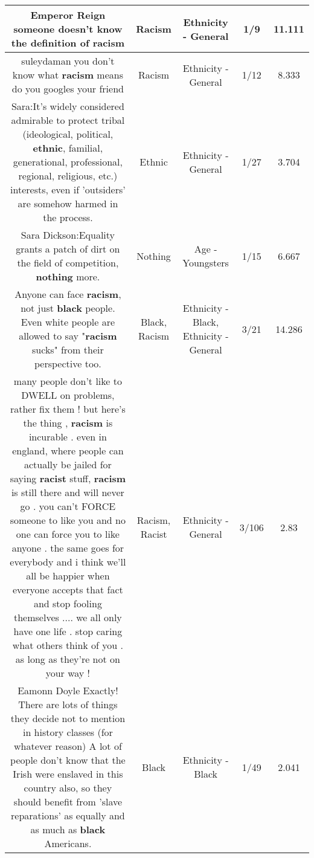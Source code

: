\documentclass[11pt]{article}
\newlength\mylength
\begin{document}
\begin{center}
\begin{longtable}{|C{.65\mylength}|C{.30\mylength}|C{.12\mylength}|C{.12\mylength}|C{.12\mylength}|}
  \small Emperor Reign someone doesn't know the definition of racism\normalsize   & Racism & Ethnicity - General & 1/9 & 11.111 \\  \hline
  \small suleydaman you don't know what \textbf{racism} means do you googles your friend\normalsize   & Racism & Ethnicity - General & 1/12 & 8.333 \\  \hline
  \small Sara:It's widely considered admirable to protect tribal (ideological, political, \textbf{ethnic}, familial, generational, professional, regional, religious, etc.) interests, even if 'outsiders' are somehow harmed in the process.\normalsize   & Ethnic & Ethnicity - General & 1/27 & 3.704 \\  \hline
  \small Sara Dickson:Equality grants a patch of dirt on the field of competition, \textbf{nothing} more.\normalsize   & Nothing & Age - Youngsters & 1/15 & 6.667 \\  \hline
  \small Anyone can face \textbf{racism}, not just \textbf{black} people. Even white people are allowed to say "\textbf{racism} sucks" from their perspective too.\normalsize   & Black, Racism & Ethnicity - Black, Ethnicity - General & 3/21 & 14.286 \\  \hline
  \small many people don't like to DWELL on problems, rather fix them ! but here's the thing , \textbf{racism} is incurable . even in england, where people can actually be jailed for saying \textbf{racist} stuff, \textbf{racism} is still there and will never go . you can't FORCE someone to like you and no one can force you to like anyone . the same goes for everybody and i think we'll all be happier when everyone accepts that fact and stop fooling themselves .... we all only have one life . stop caring what others think of you . as long as they're not on your way !\normalsize   & Racism, Racist & Ethnicity - General & 3/106 & 2.83 \\  \hline
  \small Eamonn Doyle  Exactly! There are lots of things they decide not to mention in history classes (for whatever reason) A lot of people don't know that the Irish were enslaved in this country also, so they should benefit from 'slave reparations' as equally and as much as \textbf{black} Americans.\normalsize   & Black & Ethnicity - Black & 1/49 & 2.041 \\  \hline

\end{longtable}
\end{center}
\end{document}
